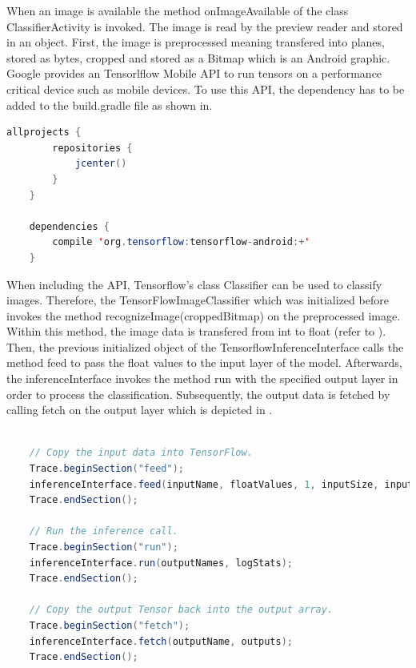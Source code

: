 When an image is available the method onImageAvailable of the class ClassifierActivity is invoked. The image is read by the preview reader and stored in an object. First, the image is preprocessed meaning transfered into planes, stored as bytes, cropped and stored as a Bitmap which is an Android graphic. Google provides an Tensorlflow Mobile API to run tensors on a performance critical device such as mobile devices. To use this API, the dependency has to be added to the build.gradle file as shown in. 

\begin{lstlisting}[caption=Tensorflow API in build.gradle, label=list:tensorflow_api, language=java]
	allprojects {
  		repositories {
        	jcenter()
    	}
	}

	dependencies {
    	compile 'org.tensorflow:tensorflow-android:+'
	}
\end{lstlisting}

When including the API, Tensorflow's class Classifier can be used to classify images. Therefore, the TensorFlowImageClassifier which was initialized before invokes the method recognizeImage(croppedBitmap) on the preprocessed image. Within this method, the image data is transfered from int to float (refer to ). Then, the previous initialized object of the TensorflowInferenceInterface calls the method feed to pass the float values to the input layer of the model. Afterwards, the inferenceInterface invokes the method run with the specified output layer in order to process the classification. Subsequently, the output data is fetched by calling fetch on the output layer which is depicted in .

\begin{lstlisting}[caption=Classifying images by the inferenceInterface \citep{TensorflowDemo}, label=list:classify_android, language=java]

    // Copy the input data into TensorFlow.
    Trace.beginSection("feed");
    inferenceInterface.feed(inputName, floatValues, 1, inputSize, inputSize, 3);
    Trace.endSection();

    // Run the inference call.
    Trace.beginSection("run");
    inferenceInterface.run(outputNames, logStats);
    Trace.endSection();

    // Copy the output Tensor back into the output array.
    Trace.beginSection("fetch");
    inferenceInterface.fetch(outputName, outputs);
    Trace.endSection();
\end{lstlisting}

